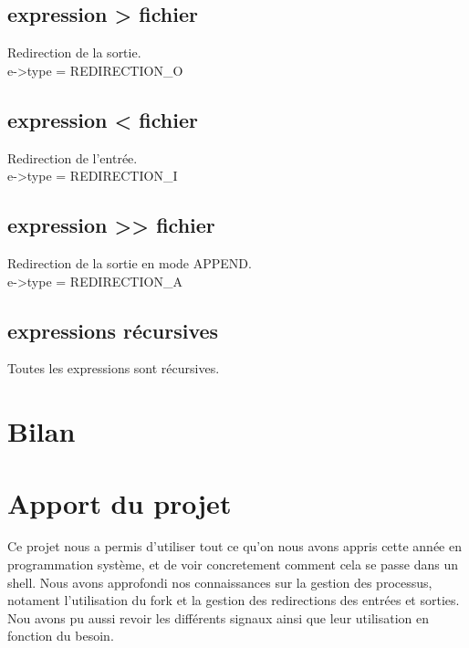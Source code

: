 \documentclass[12pt]{article}
\begin{document}
\subsection{expression > fichier}
Redirection de la sortie.
\\
e->type = REDIRECTION\_O

\subsection{expression < fichier}
Redirection de l'entrée.
\\   
e->type = REDIRECTION\_I

\subsection{expression >> fichier}
Redirection de la sortie en mode APPEND.   
\\ 
e->type = REDIRECTION\_A   

\subsection{expressions récursives}
Toutes les expressions sont récursives.

\newpage
\section{Bilan}

\newpage
\section{Apport du projet}
Ce projet nous a permis d'utiliser tout ce qu'on nous avons appris cette année en programmation système, et de voir concretement comment cela se passe dans un shell.
Nous avons approfondi nos connaissances sur la gestion des processus, notament l'utilisation du fork et la gestion des redirections des entrées et sorties.
Nou avons pu aussi revoir les différents signaux ainsi que leur utilisation en fonction du besoin.
\end{document}
